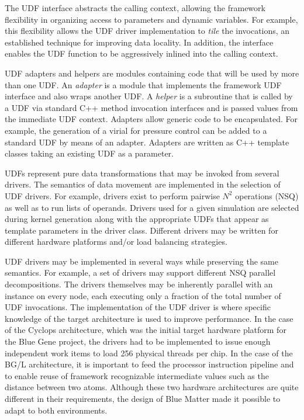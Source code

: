 \documentclass[doublespacing]{elsart}
\begin{document}
The UDF interface abstracts the calling context, allowing the
framework flexibility in organizing access to parameters and dynamic
variables.  For example, this flexibility allows the UDF driver
implementation to {\em tile} the invocations, an established technique
for improving data locality\cite{rivera:2000}.  In addition, the
interface enables the UDF function to be aggressively inlined into the
calling context.


UDF adapters and helpers are modules containing code that will be used
by more than one UDF.  An {\em adapter} is a module that implements
the framework UDF interface and also wraps another UDF.  A {\em
helper} is a subroutine that is called by a UDF via standard C++
method invocation interfaces and is passed values from the immediate
UDF context.  Adapters allow generic code to be encapsulated.  For
example, the generation of a virial for pressure control can be added
to a standard UDF by means of an adapter.  Adapters are written as C++
template classes taking an existing UDF as a parameter.


UDFs represent pure data transformations that may be invoked from
several drivers.  The semantics of data movement are implemented in
the selection of UDF drivers.  For example, drivers exist to perform
pairwise $N^2$ operations (NSQ) as well as to run lists of operands.
Drivers used for a given simulation are selected during kernel
generation along with the appropriate UDFs that appear as template
parameters in the driver class.  Different drivers may be written for
different hardware platforms and/or load balancing strategies.

UDF drivers may be implemented in several ways while preserving the
same semantics.  For example, a set of drivers may support different
NSQ parallel decompositions.  The drivers themselves may be inherently
parallel with an instance on every node, each executing only a
fraction of the total number of UDF invocations. The implementation of
the UDF driver is where specific knowledge of the target architecture
is used to improve performance.  In the case of the Cyclops
architecture\cite{allen:2001}, which was the initial target hardware
platform for the Blue Gene project, the drivers had to be implemented
to issue enough independent work items to load 256 physical threads
per chip.  In the case of the BG/L architecture\cite{bgl_sc:2002}, it
is important to feed the processor instruction pipeline and to enable
reuse of framework recognizable intermediate values such as the
distance between two atoms.  Although these two hardware architectures
are quite different in their requirements, the design of Blue Matter
made it possible to adapt to both environments.
\end{document}
